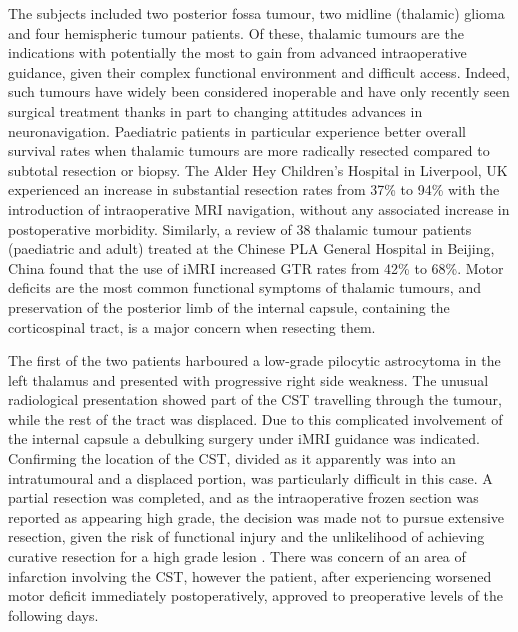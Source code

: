 The subjects included two posterior fossa tumour, two midline (thalamic) glioma and four hemispheric tumour patients.
Of these, thalamic tumours are the indications with potentially the most to gain from advanced intraoperative guidance, given their complex functional environment and difficult access.
Indeed, such tumours have widely been considered inoperable and have only recently seen surgical treatment thanks in part to changing attitudes\autocite{Souweidane1996,Puget2007} advances in neuronavigation.\autocite{Sunderland2021}
Paediatric patients in particular\autocite{Ferroli2023} experience better overall survival rates when thalamic tumours are more radically resected compared to subtotal resection or biopsy.\autocite{Cinalli2018a}
The Alder Hey Children's Hospital in Liverpool, UK experienced an increase in substantial resection  rates from 37\% to 94\% with the introduction of intraoperative MRI navigation, without any associated increase in postoperative morbidity.\autocite{Sunderland2021}
Similarly, a review of 38 thalamic tumour patients (paediatric and adult) treated at the Chinese PLA General Hospital in Beijing, China found that the use of iMRI increased GTR rates from 42\% to 68\%.\autocite{Zheng2016}
Motor deficits are the most common functional symptoms of thalamic tumours,\autocite{Puget2007, Zheng2016, Palmisciano2021} and preservation of the posterior limb of the internal capsule, containing the corticospinal tract, is a major concern when resecting them.


The first of the two patients harboured a low-grade pilocytic astrocytoma in the left thalamus and presented with progressive right side weakness.
The unusual radiological presentation showed part of the CST travelling through the tumour, while the rest of the tract was displaced.
Due to this complicated involvement of the internal capsule a debulking surgery under iMRI guidance was indicated.
Confirming the location of the CST, divided as it apparently was into an intratumoural and a displaced portion, was particularly difficult in this case.
A partial resection was completed, and as the intraoperative frozen section  was reported as appearing high grade, the decision was made not to pursue extensive resection, given the risk of functional injury and the unlikelihood of achieving curative resection for a high grade lesion .
There was concern of an area of infarction involving the CST, however the patient, after experiencing worsened motor deficit immediately postoperatively, approved to preoperative levels of the following days.

